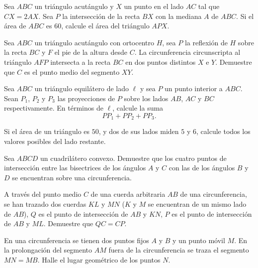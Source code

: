 \begin{problem}[CAM 2025]
Sea $ABC$ un triángulo acutángulo y $X$ un punto en
el lado $AC$ tal que $CX = 2AX$. Sea $P$ la intersección
de la recta $BX$ con la mediana $A$ de $ABC$. Si el
área de $ABC$ es $60$, calcule el área del triángulo $APX$.
\end{problem}

\begin{problem}
Sea $ABC$ un triángulo acutángulo con ortocentro $H$, sea $P$ la reflexión
de $H$ sobre la recta $BC$ y $F$ el pie de la altura desde $C$. La
circunferencia circunscripta al triángulo $AFP$ intersecta
a la recta $BC$ en dos puntos distintos $X$ e $Y$.
Demuestre que $C$ es el punto medio del segmento $XY$.
\end{problem}

\begin{problem}
Sea $ABC$ un triángulo equilátero de lado $\ell$ y sea $P$ un punto interior
a $ABC$. Sean $P_1$, $P_2$ y $P_3$ las proyecciones de $P$ sobre
los lados $AB$, $AC$ y $BC$ respectivamente. En términos de
$\ell$, calcule la suma
\[PP_1 + PP_2 + PP_3.\]
\end{problem}

\begin{problem}
Si el área de un triángulo es $50$, y dos de sus lados miden
$5$ y $6$, calcule todos los valores posibles del lado restante.
\end{problem}

\begin{problem}
Sea $ABCD$ un cuadrilátero convexo.
Demuestre que los cuatro puntos de intersección
entre las bisectrices de los ángulos
$A$ y $C$ con las de los ángulos $B$ y $D$
se encuentran sobre una circunferencia.
\end{problem}

\begin{problem}
A través del punto medio $C$ de una cuerda arbitraria $AB$ de una circunferencia,
se han trazado dos cuerdas $KL$ y $MN$
($K$ y $M$ se encuentran de un mismo lado de $AB$), $Q$ es el punto de intersección
de $AB$ y $KN$, $P$ es el punto de intersección de $AB$ y $ML$. Demuestre que $QC = CP$.
\end{problem}

\begin{problem}
En una circunferencia se tienen dos puntos fijos
$A$ y $B$ y un punto móvil $M$. En la prolongación del segmento
$AM$ fuera de la circunferencia se traza el segmento $MN = MB$.
Halle el lugar geométrico de los puntos $N$.
\end{problem}


